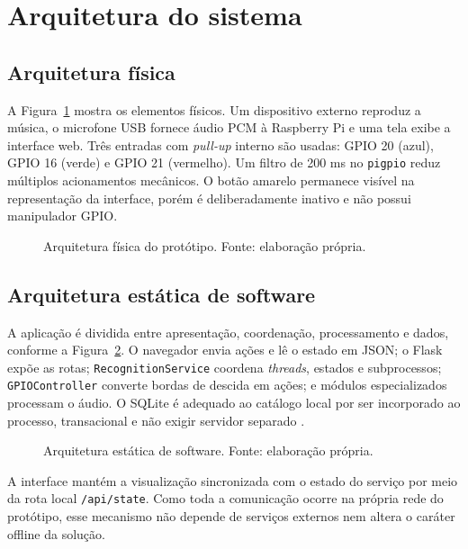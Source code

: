 \documentclass[12pt,a4paper]{article}
\newcommand{\codigo}[1]{\texttt{#1}}
\begin{document}
\section{Arquitetura do sistema}

\subsection{Arquitetura física}

A Figura~\ref{fig:arquitetura-fisica} mostra os elementos físicos. Um dispositivo
externo reproduz a música, o microfone USB fornece áudio PCM à Raspberry Pi e uma
tela exibe a interface web. Três entradas com \emph{pull-up} interno são usadas:
GPIO 20 (azul), GPIO 16 (verde) e GPIO 21 (vermelho). Um filtro de 200 ms no
\codigo{pigpio} reduz múltiplos acionamentos mecânicos. O botão amarelo permanece
visível na representação da interface, porém é deliberadamente inativo e não
possui manipulador GPIO.

\begin{figure}[H]
    \centering
    \resizebox{\textwidth}{!}{}
    \caption{Arquitetura física do protótipo. Fonte: elaboração própria.}
    \label{fig:arquitetura-fisica}
\end{figure}

\subsection{Arquitetura estática de software}

A aplicação é dividida entre apresentação, coordenação, processamento e dados,
conforme a Figura~\ref{fig:arquitetura-software}. O navegador envia ações e lê o
estado em JSON; o Flask expõe as rotas; \codigo{RecognitionService} coordena
\emph{threads}, estados e subprocessos; \codigo{GPIOController} converte bordas
de descida em ações; e módulos especializados processam o áudio. O SQLite é
adequado ao catálogo local por ser incorporado ao processo, transacional e não
exigir servidor separado \cite{sqlite2026}.

\begin{figure}[H]
    \centering
    \resizebox{\textwidth}{!}{}
    \caption{Arquitetura estática de software. Fonte: elaboração própria.}
    \label{fig:arquitetura-software}
\end{figure}

A interface mantém a visualização sincronizada com o estado do serviço por meio
da rota local \codigo{/api/state}. Como toda a comunicação ocorre na própria rede
do protótipo, esse mecanismo não depende de serviços externos nem altera o
caráter offline da solução.
\end{document}
